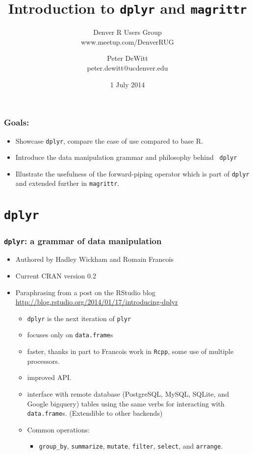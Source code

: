 \documentclass{beamer}\usepackage[]{graphicx}\usepackage[]{color}
\author{Peter DeWitt\\peter.dewitt@ucdenver.edu}
\date{1 July 2014}
\title{Introduction to {\tt dplyr} and {\tt magrittr}}
\subtitle{Denver R Users Group\\www.meetup.com/DenverRUG}
\begin{document}
\begin{frame}[fragile]
  \maketitle
\end{frame} 

\begin{frame}[fragile]
  \frametitle{Goals:}

  \begin{itemize}
    \item Showcase {\tt dplyr}, compare the ease of use compared to base R.
    \item Introduce the data manipulation grammar and philosophy behind {\tt
      dplyr}
    \item Illustrate the usefulness of the forward-piping operator which is
      part of {\tt dplyr} and extended further in {\tt magrittr}.  
  \end{itemize}


\end{frame} 

\section{{\tt dplyr}}
\begin{frame}[fragile]
  \frametitle{{\tt dplyr}: a grammar of data manipulation}
  \begin{itemize}
    \item Authored by Hadley Wickham and Romain Francois
    \item Current CRAN version 0.2

    \item<2-> Paraphrasing from a post on the RStudio blog
      \url{http://blog.rstudio.org/2014/01/17/introducing-dplyr}

      \begin{itemize}
        \item {\tt dplyr} is the next iteration of {\tt plyr}
        \item focuses only on {\tt data.frame}s
        \item faster, thanks in part to Francois work in {\tt Rcpp}, some use of
          multiple processors.
        \item improved API. 
        \item interface with remote database (PostgreSQL, MySQL, SQLite, and
          Google bigquery) tables using the same verbs for
          interacting with {\tt data.frame}s.  (Extendible to other backends)
        \item Common operations:
          \begin{itemize}
            \item {\tt group\_by}, {\tt summarize}, {\tt mutate}, {\tt filter},
              {\tt select}, and {\tt arrange}.
          \end{itemize}
      \end{itemize}

  \end{itemize}
\end{frame} 
\end{document}
